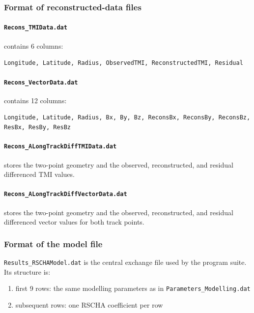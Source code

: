 \documentclass[11pt,a4paper]{article}
\begin{document}
\subsubsection{Format of reconstructed-data files}

\paragraph{\texttt{Recons\_TMIData.dat}} contains 6 columns:
\begin{center}
\texttt{Longitude, Latitude, Radius, ObservedTMI, ReconstructedTMI, Residual}
\end{center}

\paragraph{\texttt{Recons\_VectorData.dat}} contains 12 columns:
\begin{center}
\texttt{Longitude, Latitude, Radius, Bx, By, Bz, ReconsBx, ReconsBy, ReconsBz, ResBx, ResBy, ResBz}
\end{center}

\paragraph{\texttt{Recons\_ALongTrackDiffTMIData.dat}} stores the two-point geometry and the observed, reconstructed, and residual differenced TMI values.

\paragraph{\texttt{Recons\_ALongTrackDiffVectorData.dat}} stores the two-point geometry and the observed, reconstructed, and residual differenced vector values for both track points.

\subsubsection{Format of the model file}

\texttt{Results\_RSCHAModel.dat} is the central exchange file used by the program suite. Its structure is:
\begin{enumerate}
  \item first 9 rows: the same modelling parameters as in \texttt{Parameters\_Modelling.dat}
  \item subsequent rows: one RSCHA coefficient per row
\end{enumerate}
\end{document}
